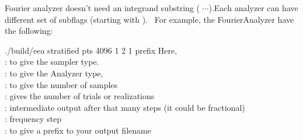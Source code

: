 \documentclass[11pt,fleqn]{book} %
\newcommand{\TBC} {}
\begin{document}
Fourier analyzer doesn't need an integrand substring ( $\cdots$).Each analyzer can have different set of subflags (starting with \cdashs). \
For example, the FourierAnalyzer have the following:
%
\begin{tcolorbox}
./build/eea   stratified   pts  4096  1   2  1   prefix
\tcblower
Here, \\
: to give the sampler type. \\
: to give the Analyzer type, \\
: to give the number of samples \\
: gives the number of trials or realizations \\
: intermediate output after that many steps (it could be fractional) \\
\cdashs{wstep}: frequency step \\
: to give a prefix to your output filename
\end{tcolorbox}
%
% 
% 
\end{document}
